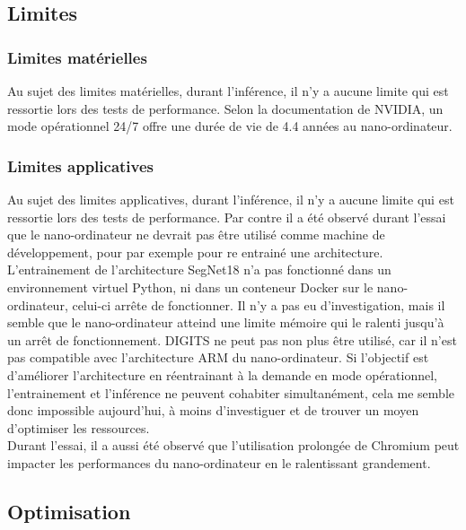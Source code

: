 \subsection{Limites}
\subsubsection{Limites matérielles}
\noindent Au sujet des limites matérielles, durant l'inférence, il n'y a aucune limite qui est ressortie lors des tests de performance. Selon la documentation de NVIDIA, un mode opérationnel 24/7 offre une durée de vie de 4.4 années au nano-ordinateur.
\subsubsection{Limites applicatives}
\noindent Au sujet des limites applicatives, durant l'inférence, il n'y a aucune limite qui est ressortie lors des tests de performance. Par contre il a été observé durant l'essai que le nano-ordinateur ne devrait pas être utilisé comme machine de développement, pour par exemple pour re entrainé une architecture. L'entrainement de l'architecture SegNet18 n'a pas fonctionné dans un environnement virtuel Python, ni dans un conteneur Docker sur le nano-ordinateur, celui-ci arrête de fonctionner. Il n'y a pas eu d'investigation, mais il semble que le nano-ordinateur atteind une limite mémoire qui le ralenti jusqu'à un arrêt de fonctionnement. DIGITS ne peut pas non plus être utilisé, car il n'est pas compatible avec l'architecture ARM du nano-ordinateur. Si l'objectif est d'améliorer l'architecture en réentrainant à la demande en mode opérationnel, l'entrainement et l'inférence ne peuvent cohabiter simultanément, cela me semble donc impossible aujourd'hui, à moins d'investiguer et de trouver un moyen d'optimiser les ressources.
\vspace{\baselineskip}
\\
\noindent Durant l'essai, il a aussi été observé que l'utilisation prolongée de Chromium peut impacter les performances du nano-ordinateur en le ralentissant grandement. 
\subsection{Optimisation}
